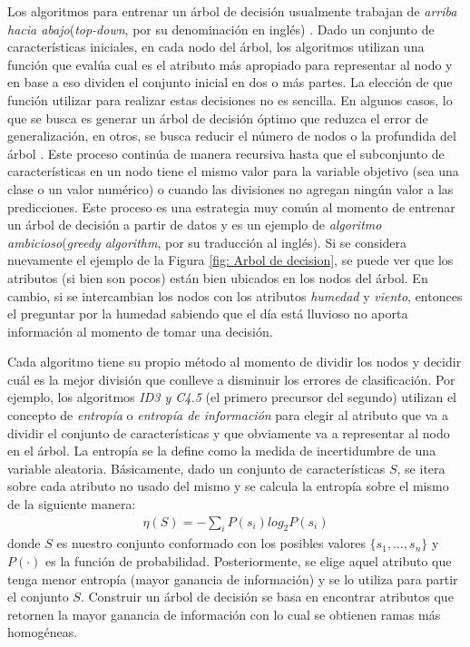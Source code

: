 	Los algoritmos para entrenar un árbol de decisión usualmente trabajan de \textit{arriba hacia abajo}(\textit{top-down}, por su denominación en inglés) \cite{LROM05}. Dado un conjunto de características iniciales, en cada nodo del árbol, los algoritmos utilizan una función que evalúa cual es el atributo más apropiado para representar al nodo y en base a eso dividen el conjunto inicial en dos o más partes. La elección de que función utilizar para realizar estas decisiones no es sencilla. En algunos casos, lo que se busca es generar un árbol de decisión óptimo que reduzca el error de generalización, en otros, se busca reducir el número de nodos o la profundida del árbol \cite{LROM10}. Este proceso continúa de manera recursiva hasta que el subconjunto de características en un nodo tiene el mismo valor para la variable objetivo (sea una clase o un valor numérico) o cuando las divisiones no agregan ningún valor a las predicciones. Este proceso es una estrategia muy común al momento de entrenar un árbol de decisión a partir de datos y es un ejemplo de \textit{algoritmo ambicioso}(\textit{greedy algorithm}, por su traducción al inglés). Si se considera nuevamente el ejemplo de la Figura \ref{fig: Arbol de decision}, se puede ver que los atributos (si bien son pocos) están bien ubicados en los nodos del árbol. En cambio, si se intercambian los nodos con los atributos \textit{humedad} y \textit{viento}, entonces el preguntar por la humedad sabiendo que el día está lluvioso no aporta información al momento de tomar una decisión.
	
	Cada algoritmo tiene su propio método al momento de dividir los nodos y decidir cuál es la mejor división que conlleve a disminuir los errores de clasificación. Por ejemplo, los algoritmos \textit{ID3 y C4.5} \cite{QuinlanID3, QuinlanC45} (el primero precursor del segundo)  utilizan el concepto de \textit{entropía} o \textit{entropía de información} para elegir al atributo que va a dividir el conjunto de características y que obviamente va a representar al nodo en el árbol. La entropía se la define como la medida de incertidumbre de una variable aleatoria.  Básicamente, dado un conjunto de características $S$, se itera sobre cada atributo no usado del mismo y se calcula la entropía sobre el mismo de la siguiente manera:
	\begin{align}
		\eta(S) = -\sum_i P(s_i)log_{2}P(s_i)
	\end{align}
	donde $S$ es nuestro conjunto conformado con los posibles valores $\{ s_1,\dots, s_n \}$ y $P( \cdot )$ es la función de probabilidad. Posteriormente, se elige aquel atributo que tenga menor entropía (mayor ganancia de información) y se lo utiliza para partir el conjunto $S$. Construir un árbol de decisión se basa en encontrar atributos que retornen la mayor ganancia de información con lo cual se obtienen ramas más homogéneas.
	
